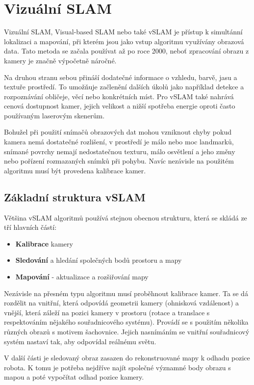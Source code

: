 \documentclass[12pt,a4paper]{article}
\begin{document}
\section{Vizuální SLAM}
Vizuální SLAM, Visual-based SLAM nebo také vSLAM je přístup k simultánní lokalizaci a mapování, při kterém jsou jako vstup algoritmu využívány obrazová data. Tato metoda se začala používat až po roce 2000, neboť zpracování obrazu z kamery je značně výpočetně náročné. 

Na druhou stranu sebou přináší dodatečné informace o vzhledu, barvě, jasu a textuře prostředí. To umožňuje začlenění dalších úkolů jako například detekce a rozpoznávání obličeje, věcí nebo konkrétních míst. Pro vSLAM také nahrává cenová dostupnost kamer, jejich velikost a nižší spotřeba energie oproti často používaným laserovým skenerům. 

Bohužel při použití snímačů obrazových dat mohou vzniknout chyby pokud kamera nemá dostatečné rozlišení, v prostředí je málo nebo moc landmarků, snímané povrchy nemají nedostatečnou texturu, málo osvětlení a jeho změny nebo pořízení rozmazaných snímků při pohybu. Navíc nezávisle na použitém algoritmu musí být provedena kalibrace kamer.

\subsection{Základní struktura vSLAM}
Většina vSLAM algoritmů používá stejnou obecnou strukturu, která se skládá ze tří hlavních částí:
\begin{itemize}
\item \textbf{Kalibrace} kamery 
\item \textbf{Sledování} a hledání společných bodů prostoru a mapy
\item \textbf{Mapování} - aktualizace a rozšiřování mapy
\end{itemize}

Nezávisle na přesném typu algoritmu musí proběhnout kalibrace kamer. Ta se dá rozdělit na vnitřní, která odpovídá geometrii kamery (ohnisková vzdálenost) a vnější, která záleží na pozici kamery v prostoru (rotace a translace s respektováním nějakého souřadnicového systému). Provádí se s použitím několika různých obrazů s motivem šachovnice. Jejich nasnímáním se vnitřní souřadnicový systém nastaví tak, aby odpovídal reálnému světu.

V další části je sledovaný obraz zasazen do rekonstruované mapy k odhadu pozice robota. K tomu je potřeba nejdříve najít společné významné body obrazu s mapou a poté vypočítat odhad pozice kamery.
\end{document}
